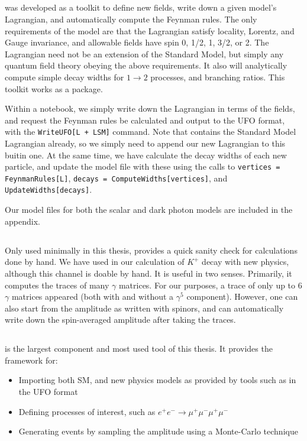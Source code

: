 \subsection{\feynrules}
\feynrules was developed as a toolkit to define new fields, write down a given model's Lagrangian, and automatically compute the Feynman rules.
The only requirements of the model are that the Lagrangian satisfy locality, Lorentz, and Gauge invariance, and allowable fields have spin 0, 1/2, 1, 3/2, or 2. The Lagrangian need not be an extension of the Standard Model, but simply any quantum field theory obeying the above requirements. 
It also will analytically compute simple decay widths for $1 \rightarrow 2$ processes, and branching ratios.
This toolkit works as a \mathematica package.

Within a \mathematica notebook, we simply write down the Lagrangian in terms of the fields, and request the Feynman rules be calculated and output to the UFO format, with the \texttt{WriteUFO[L + LSM]} command. Note that \feynrules contains the Standard Model Lagrangian already, so we simply need to append our new Lagrangian to this buitin one.
At the same time, we have \feynrules calculate the decay widths of each new particle, and update the model file with these using the calls to \texttt{vertices = FeynmanRules[L]}, \texttt{decays = ComputeWidths[vertices]}, and \texttt{UpdateWidths[decays]}.

Our model files for both the scalar and dark photon models are included in the appendix. 

\subsection{\feyncalc}
Only used minimally in this thesis, \feyncalc provides a quick sanity check for calculations done by hand.
We have used \feyncalc in our calculation of $K^+$ decay with new physics, although this channel is doable by hand.
It is useful in two senses. Primarily, it computes the traces of many $\gamma$ matrices.
For our purposes, a trace of only up to 6 $\gamma$ matrices appeared (both with and without a $\gamma^5$ component).
However, one can also start from the amplitude as written with spinors, and \feyncalc can automatically write down the spin-averaged amplitude after taking the traces.

\subsection{\madgraph}
\madgraph is the largest component and most used tool of this thesis.
It provides the framework for:
\begin{itemize}
    \item Importing both SM, and new physics models as provided by tools such as \feynrules in the UFO format
    \item Defining processes of interest, such as $e^+ e^- \rightarrow \mu^+ \mu^- \mu^+ \mu^-$
    \item Generating events by sampling the amplitude using a Monte-Carlo technique
\end{itemize}
